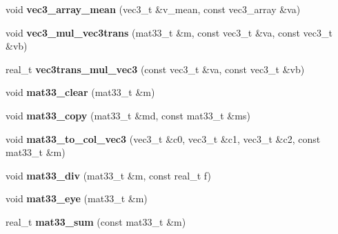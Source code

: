 \begin{DoxyCompactItemize}
\item 
void {\bfseries vec3\+\_\+array\+\_\+mean} (vec3\+\_\+t \&v\+\_\+mean, const vec3\+\_\+array \&va)\hypertarget{namespacekukadu_a9aa2138f4731e1f53bff62725417a44c}{}\label{namespacekukadu_a9aa2138f4731e1f53bff62725417a44c}

\item 
void {\bfseries vec3\+\_\+mul\+\_\+vec3trans} (mat33\+\_\+t \&m, const vec3\+\_\+t \&va, const vec3\+\_\+t \&vb)\hypertarget{namespacekukadu_ac1949d6e91d37e96db9b8ca4834a8490}{}\label{namespacekukadu_ac1949d6e91d37e96db9b8ca4834a8490}

\item 
real\+\_\+t {\bfseries vec3trans\+\_\+mul\+\_\+vec3} (const vec3\+\_\+t \&va, const vec3\+\_\+t \&vb)\hypertarget{namespacekukadu_ae8839677d0be7553f7977bc81eddd8cb}{}\label{namespacekukadu_ae8839677d0be7553f7977bc81eddd8cb}

\item 
void {\bfseries mat33\+\_\+clear} (mat33\+\_\+t \&m)\hypertarget{namespacekukadu_ac0b6e3968b1c6d4b9c838c56dade548a}{}\label{namespacekukadu_ac0b6e3968b1c6d4b9c838c56dade548a}

\item 
void {\bfseries mat33\+\_\+copy} (mat33\+\_\+t \&md, const mat33\+\_\+t \&ms)\hypertarget{namespacekukadu_a747e112bf6d45d6d28b83bf63ee6ebdb}{}\label{namespacekukadu_a747e112bf6d45d6d28b83bf63ee6ebdb}

\item 
void {\bfseries mat33\+\_\+to\+\_\+col\+\_\+vec3} (vec3\+\_\+t \&c0, vec3\+\_\+t \&c1, vec3\+\_\+t \&c2, const mat33\+\_\+t \&m)\hypertarget{namespacekukadu_a214483aae32799d3e6cfe44c01ab891c}{}\label{namespacekukadu_a214483aae32799d3e6cfe44c01ab891c}

\item 
void {\bfseries mat33\+\_\+div} (mat33\+\_\+t \&m, const real\+\_\+t f)\hypertarget{namespacekukadu_a303e892cb293c35cbb39f7cc0ac331b0}{}\label{namespacekukadu_a303e892cb293c35cbb39f7cc0ac331b0}

\item 
void {\bfseries mat33\+\_\+eye} (mat33\+\_\+t \&m)\hypertarget{namespacekukadu_aaf87451149c66e1eee5b3bd590cdfc82}{}\label{namespacekukadu_aaf87451149c66e1eee5b3bd590cdfc82}

\item 
real\+\_\+t {\bfseries mat33\+\_\+sum} (const mat33\+\_\+t \&m)\hypertarget{namespacekukadu_a9c2fc85ec0e38e30e6f92f3a42b21307}{}\label{namespacekukadu_a9c2fc85ec0e38e30e6f92f3a42b21307}


\end{DoxyCompactItemize}
